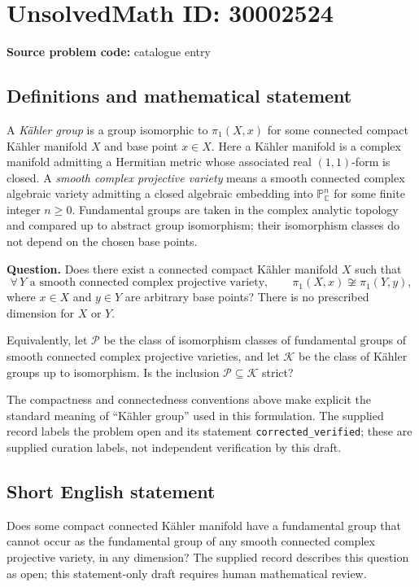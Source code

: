 \documentclass[11pt]{article}
\newcommand{\C}{\mathbb{C}}
\newcommand{\PP}{\mathbb{P}}
\begin{document}
\section*{UnsolvedMath ID: 30002524}
\textbf{Source problem code:} catalogue entry
\subsection{Definitions and mathematical statement}
A \emph{Kähler group} is a group isomorphic to \(\pi_1(X,x)\) for some connected compact Kähler manifold \(X\) and base point \(x\in X\). Here a Kähler manifold is a complex manifold admitting a Hermitian metric whose associated real \((1,1)\)-form is closed. A \emph{smooth complex projective variety} means a smooth connected complex algebraic variety admitting a closed algebraic embedding into \(\PP^n_{\C}\) for some finite integer \(n\geq 0\). Fundamental groups are taken in the complex analytic topology and compared up to abstract group isomorphism; their isomorphism classes do not depend on the chosen base points.

\textbf{Question.} Does there exist a connected compact Kähler manifold \(X\) such that
\[
\forall\,Y\text{ a smooth connected complex projective variety},\qquad
\pi_1(X,x)\not\cong\pi_1(Y,y),
\]
where \(x\in X\) and \(y\in Y\) are arbitrary base points? There is no prescribed dimension for \(X\) or \(Y\).

Equivalently, let \(\mathcal P\) be the class of isomorphism classes of fundamental groups of smooth connected complex projective varieties, and let \(\mathcal K\) be the class of Kähler groups up to isomorphism. Is the inclusion \(\mathcal P\subseteq\mathcal K\) strict?

The compactness and connectedness conventions above make explicit the standard meaning of ``Kähler group'' used in this formulation. The supplied record labels the problem open and its statement \texttt{corrected\_verified}; these are supplied curation labels, not independent verification by this draft.
\subsection{Short English statement}
Does some compact connected Kähler manifold have a fundamental group that cannot occur as the fundamental group of any smooth connected complex projective variety, in any dimension? The supplied record describes this question as open; this statement-only draft requires human mathematical review.
\end{document}
